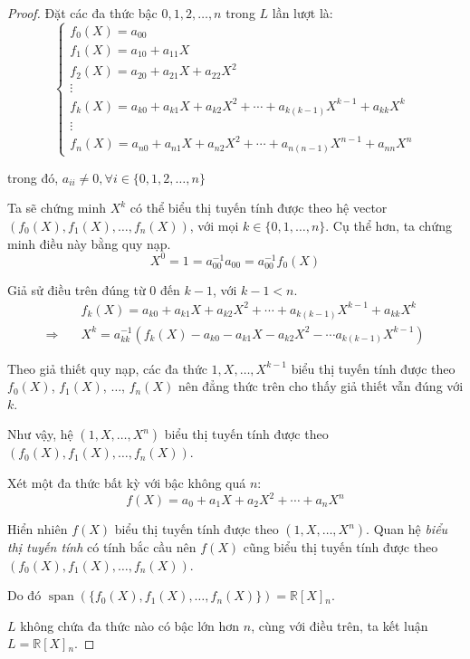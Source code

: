 \begin{proof}
    Đặt các đa thức bậc $0, 1, 2,\ldots, n$ trong $L$ lần lượt là:
    \[
        \begin{cases}
            f_{0}(X) = a_{00}                                                                    \\
            f_{1}(X) = a_{10} + a_{11}X                                                          \\
            f_{2}(X) = a_{20} + a_{21}X + a_{22}X^{2}                                            \\
            \vdots                                                                               \\
            f_{k}(X) = a_{k0} + a_{k1}X + a_{k2}X^{2} + \cdots + a_{k(k-1)}X^{k-1} + a_{kk}X^{k} \\
            \vdots                                                                               \\
            f_{n}(X) = a_{n0} + a_{n1}X + a_{n2}X^{2} + \cdots + a_{n(n-1)}X^{n-1} + a_{nn}X^{n}
        \end{cases}
    \]
    
    trong đó, $a_{ii}\ne 0, \forall i\in\{0, 1, 2,\ldots, n\}$
    
    Ta sẽ chứng minh $X^{k}$ có thể biểu thị tuyến tính được theo hệ vector $(f_{0}(X), f_{1}(X), \ldots, f_{n}(X))$, với mọi $k\in\{0,1,\ldots, n\}$. Cụ thể hơn, ta chứng minh điều này bằng quy nạp.
    \[ X^{0} = 1 = a^{-1}_{00}a_{00} = a^{-1}_{00}f_{0}(X) \]
    
    Giả sử điều trên đúng từ $0$ đến $k-1$, với $k-1 < n$.
    \begin{align*}
                         & f_{k}(X) = a_{k0} + a_{k1}X + a_{k2}X^{2} + \cdots + a_{k(k-1)}X^{k-1} + a_{kk}X^{k}      \\
        \Rightarrow\quad & X^{k} = a^{-1}_{kk}(f_{k}(X) - a_{k0} - a_{k1}X - a_{k2}X^{2} - \cdots a_{k(k-1)}X^{k-1})
    \end{align*}
    
    Theo giả thiết quy nạp, các đa thức $1, X, \ldots, X^{k-1}$ biểu thị tuyến tính được theo $f_{0}(X)$, $f_{1}(X)$, $\ldots$, $f_{n}(X)$ nên đẳng thức trên cho thấy giả thiết vẫn đúng với $k$.
    
    Như vậy, hệ $(1, X, \ldots, X^{n})$ biểu thị tuyến tính được theo $(f_{0}(X), f_{1}(X), \ldots, f_{n}(X))$.
    
    Xét một đa thức bất kỳ với bậc không quá $n$:
    \[ f(X) = a_{0} + a_{1}X + a_{2}X^{2} + \cdots + a_{n}X^{n} \]
    
    Hiển nhiên $f(X)$ biểu thị tuyến tính được theo $(1, X, \ldots, X^{n})$. Quan hệ \textit{biểu thị tuyến tính} có tính bắc cầu nên $f(X)$ cũng biểu thị tuyến tính được theo $(f_{0}(X), f_{1}(X), \ldots, f_{n}(X))$.
    
    Do đó $\operatorname{span}(\{f_{0}(X), f_{1}(X),\ldots, f_{n}(X)\}) = \mathbb{R}[X]{}_{n}$.
    
    $L$ không chứa đa thức nào có bậc lớn hơn $n$, cùng với điều trên, ta kết luận $L = \mathbb{R}[X]{}_{n}$.
\end{proof}

